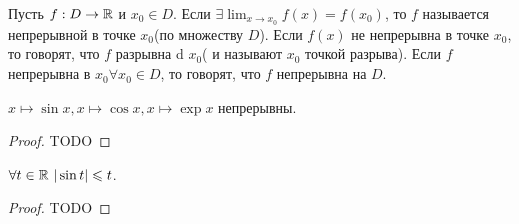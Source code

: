 \begin{definition}
	Пусть $ f: D \to \mathbb{R} $ и $ x_0 \in D $. Если $ \exists \lim_{x \to x_0} f(x) = f(x_0)$, то $ f $ называется непрерывной в точке $ x_0 $(по множеству $ D $). Если $ f(x) $ не непрерывна в точке $ x_0 $,  то говорят, что $ f $ разрывна d $ x_0 $( и называют $ x_0 $ точкой разрыва).
	Если $ f $ непрерывна в $ x_0 \forall  x_0 \in  D $, то говорят, что $ f $ непрерывна на $ D $.
\end{definition}
\begin{proposition}
	 $ x \mapsto \sin x, x \mapsto \cos x, x \mapsto \exp x $ непрерывны.
\end{proposition} \begin{proof}
	TODO
\end{proof}
\begin{lemma}
	 $ \forall t \in \mathbb{R} \ |\sin t| \leqslant  t $.
\end{lemma} \begin{proof}
	TODO
\end{proof}